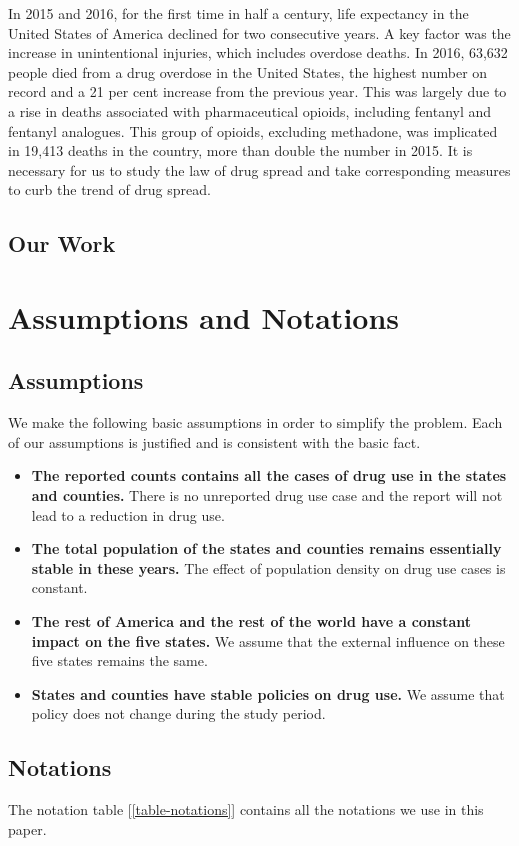 \documentclass{mcmthesis}
\begin{document}
In 2015 and 2016, for the first time in half a century, life expectancy in the United States of America declined for two consecutive years. A key factor was the increase in unintentional injuries, which includes overdose deaths. In 2016, 63,632 people died from a drug overdose in the United States, the highest number on record and a 21 per cent increase from the previous year. This was largely due to a rise in deaths associated with pharmaceutical opioids, including fentanyl and fentanyl analogues. This group of opioids, excluding methadone, was implicated in 19,413 deaths in the country, more than double the number in 2015. It is necessary for us to study the law of drug spread and take corresponding measures to curb the trend of drug spread.\cite{1}

\subsection{Our Work}


\section{Assumptions and Notations}

\subsection{Assumptions}
We make the following basic assumptions in order to simplify the problem. Each
of our assumptions is justified and is consistent with the basic fact.
\begin{itemize}
	\item \textbf{The reported counts contains all the cases of drug use in the states and counties.} There is no unreported drug use case and the report will not lead to a reduction in drug use.
	\item \textbf{The total population of the states and counties remains essentially stable in these years.} The effect of population density on drug use cases is constant.
	\item \textbf{The rest of America and the rest of the world have a constant impact on the five states.} We assume that the external influence on these five states remains the same.
	\item \textbf{States and counties have stable policies on drug use.} We assume that policy does not change during the study period.
\end{itemize}

\subsection{Notations}
The notation table [\ref{table-notations}] contains all the notations we use in this paper.
\end{document}
